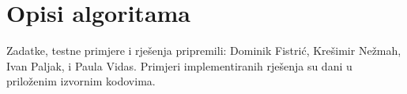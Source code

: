 \documentclass[a4paper]{article}
\date{May 29th 2022.}
\begin{document}
\section*{Opisi algoritama}
Zadatke, testne primjere i rješenja pripremili: Dominik Fistrić, Krešimir
Nežmah, Ivan Paljak, i Paula Vidas.  Primjeri implementiranih rješenja su dani
u priloženim izvornim kodovima.
\end{document}

